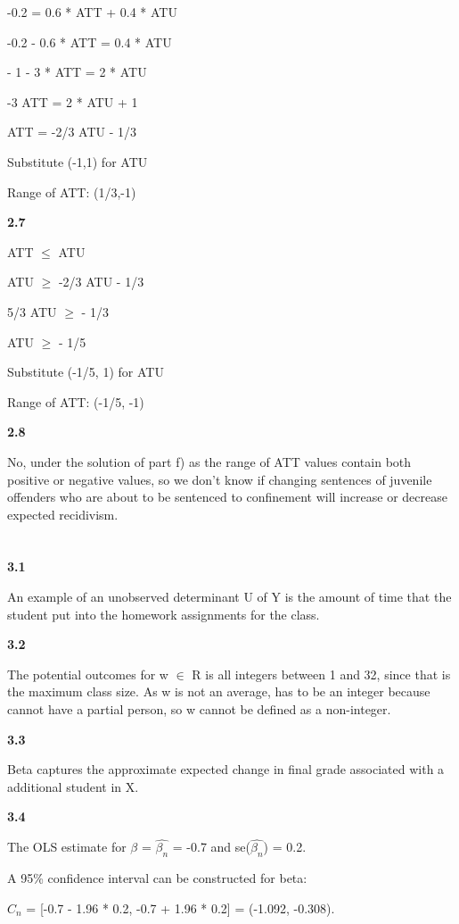 -0.2 = 0.6 * ATT + 0.4 * ATU

-0.2 - 0.6 * ATT = 0.4 * ATU

- 1 - 3 * ATT = 2 * ATU

-3 ATT = 2 * ATU + 1

ATT = -2/3 ATU - 1/3

Substitute (-1,1) for ATU

Range of ATT: (1/3,-1)

\textbf{2.7}

ATT $\leq$ ATU

ATU $\geq$ -2/3 ATU - 1/3

5/3 ATU $\geq$ - 1/3

ATU $\geq$ - 1/5

Substitute (-1/5, 1) for ATU

Range of ATT: (-1/5, -1)

\textbf{2.8}

No, under the solution of part f) as the range of ATT values contain both positive or negative values, so we don't know if changing sentences of juvenile offenders who are about to be sentenced to confinement will increase or decrease expected recidivism.

\newpage
\section{}

\textbf{3.1}

An example of an unobserved determinant U of Y is the amount of time that the student put into the homework assignments for the class.

\textbf{3.2}

The potential outcomes for w $\in$ R is all integers between 1 and 32, since that is the maximum class size. As w is not an average, has to be an integer because cannot have a partial person, so w cannot be defined as a non-integer.

\textbf{3.3}

Beta captures the approximate expected change in final grade associated with a additional student in X.

\textbf{3.4}

The OLS estimate for $\beta$ = $\hat{\beta_{n}}$ = -0.7 and se({$\hat{\beta_{n}}$}) = 0.2.

A 95\% confidence interval can be constructed for beta:

$C_{n}$ = [-0.7 - 1.96 * 0.2, -0.7 + 1.96 * 0.2] = (-1.092, -0.308).

